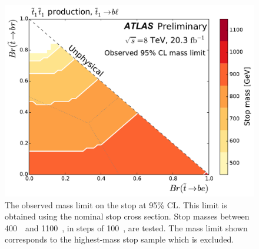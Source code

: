 \begin{figure}[p]
  \centering
  \includegraphics[width=\textwidth]
    {figs/blstop/mass_limit_contours_no_extras_obs.pdf}
  \caption{
    The observed mass limit on the stop at 95\% CL.
    This limit is obtained using the nominal stop cross section.
    Stop masses between 400~\GeV\ and 1100~\GeV, in steps of 100~\GeV, are
    tested.
    The mass limit shown corresponds to the highest-mass stop sample which is
    excluded.
  }
  \label{fig:mass_limit_obs}
\end{figure}



